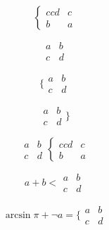 \documentclass{article}
\def\mockarray{\begin{array}{cc} 
  a & b \\
  c & d \end{array}}
\def\mockcases{\begin{cases}{cc} 
  d & c \\
  b & a \end{cases}}
\begin{document}
\[\mockcases\]

\[\mockarray\]
  
\[\{ \mockarray\]
  
\[\mockarray \}\]

\[ \mockarray \mockcases \]

\[ a + b < \mockarray \]

\[ \arcsin \pi + \neg a = \{ \mockarray \]
\end{document}
